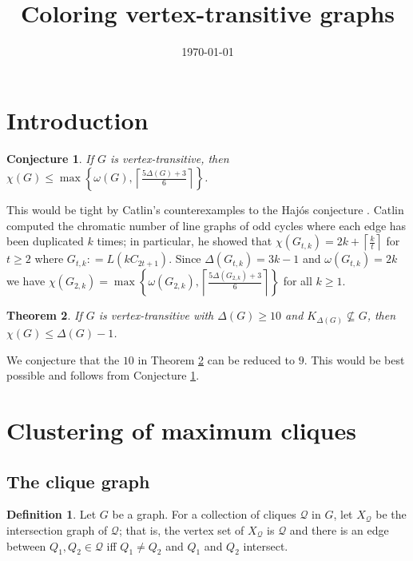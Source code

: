 \documentclass[12pt]{article}
\title{Coloring vertex-transitive graphs}
\date{\today}
\theoremstyle{plain}
\newtheorem{thm}{Theorem}[section]
\newtheorem{conjecture}[thm]{Conjecture}
\theoremstyle{definition}
\newtheorem{defn}{Definition}
\theoremstyle{remark}
\newcommand{\fancy}[1]{\mathcal{#1}}
\newcommand{\set}[1]{\left\{ #1 \right\}}
\newcommand{\ceil}[1]{\left\lceil#1\right\rceil}
\newcommand{\DefinedAs}{\mathrel{\mathop:}=}
\def\Q{\fancy{Q}}
\begin{document}
\maketitle

\begin{abstract}
\end{abstract}

\section{Introduction}
\begin{conjecture}\label{MainConjecture}
If $G$ is vertex-transitive, then $\chi(G) \le \max \set{\omega(G), \ceil{\frac{5\Delta(G) + 3}{6}}}$.
\end{conjecture}

This would be tight by Catlin's counterexamples to the Haj{\'o}s conjecture \cite{catlin1979hajos}.  Catlin computed the chromatic number of line graphs of odd cycles where each edge has been duplicated $k$ times; in particular, he showed that $\chi(G_{t,k}) = 2k + \ceil{\frac{k}{t}}$ for $t \ge 2$ where $G_{t,k} \DefinedAs L(kC_{2t+1})$.  Since $\Delta(G_{t,k}) = 3k-1$ and $\omega(G_{t,k}) = 2k$ we have $\chi(G_{2, k}) = \max \set{\omega(G_{2,k}), \ceil{\frac{5\Delta(G_{2,k}) + 3}{6}}}$ for all $k \ge 1$.

\begin{thm}\label{BKTransitive}
If $G$ is vertex-transitive with $\Delta(G) \ge 10$ and $K_{\Delta(G)} \not \subseteq G$, then $\chi(G) \le \Delta(G) - 1$.
\end{thm}

We conjecture that the $10$ in Theorem \ref{BKTransitive} can be reduced to $9$.  This would be best possible and follows from Conjecture \ref{MainConjecture}.
\section{Clustering of maximum cliques}
\subsection{The clique graph}
\begin{defn}
Let $G$ be a graph. For a collection of cliques $\Q$ in $G$, let $X_\Q$ be the intersection graph of $\Q$; that is, the vertex set of $X_\Q$ is $\Q$ and there is an edge between $Q_1, Q_2 \in \Q$ iff $Q_1 \ne Q_2$ and $Q_1$ and $Q_2$ intersect.
\end{defn}
\end{document}
